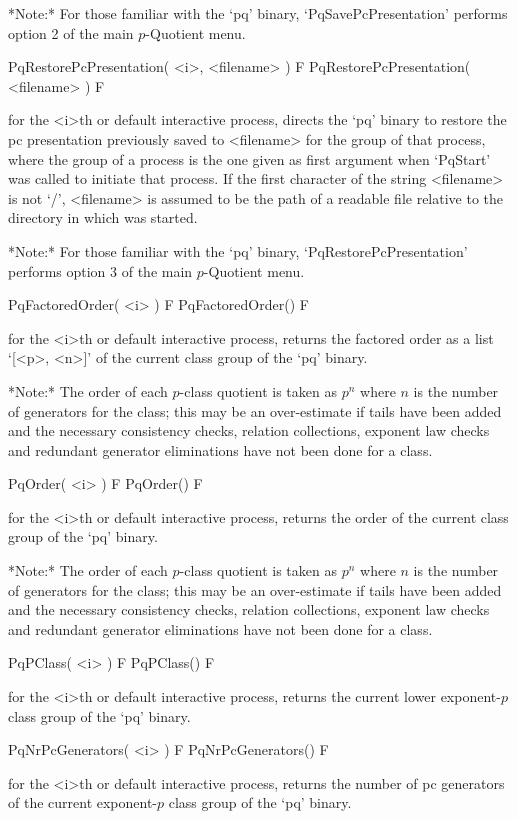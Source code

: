 *Note:* For those familiar with the `pq'  binary,  `PqSavePcPresentation'
performs option 2 of the main $p$-Quotient menu.

\>PqRestorePcPresentation( <i>, <filename> ) F
\>PqRestorePcPresentation( <filename> ) F

for the <i>th or default interactive {\ANUPQ} process, directs  the  `pq'
binary to restore the pc presentation previously saved to <filename>  for
the group of that process, where the group of a process is the one  given
as first argument when `PqStart' was called to initiate that process.  If
the first character of the string <filename> is not  `/',  <filename>  is
assumed to be the path of a readable file relative to  the  directory  in
which {\GAP} was started.

*Note:*
For  those  familiar  with  the  `pq'  binary,  `PqRestorePcPresentation'
performs option 3 of the main $p$-Quotient menu.

\>PqFactoredOrder( <i> ) F
\>PqFactoredOrder() F

for the <i>th  or  default  interactive  {\ANUPQ}  process,  returns  the
factored order as a list `[<p>, <n>]' of the current class group  of  the
`pq' binary.

*Note:* The order of each $p$-class quotient is taken as $p^n$ where  $n$
is the number of generators for the class; this may be  an  over-estimate
if tails have been added and the necessary consistency  checks,  relation
collections, exponent law checks  and  redundant  generator  eliminations
have not been done for a class.

\>PqOrder( <i> ) F
\>PqOrder() F

for the <i>th or default interactive {\ANUPQ} process, returns the  order
of the current class group of the `pq' binary.

*Note:* The order of each $p$-class quotient is taken as $p^n$ where  $n$
is the number of generators for the class; this may be  an  over-estimate
if tails have been added and the necessary consistency  checks,  relation
collections, exponent law checks  and  redundant  generator  eliminations
have not been done for a class.

\>PqPClass( <i> ) F
\>PqPClass() F

for the <i>th  or  default  interactive  {\ANUPQ}  process,  returns  the
current lower exponent-$p$ class group of the `pq' binary.

\>PqNrPcGenerators( <i> ) F
\>PqNrPcGenerators() F

for the <i>th or default interactive {\ANUPQ} process, returns the number
of pc generators of the current exponent-$p$  class  group  of  the  `pq'
binary.


